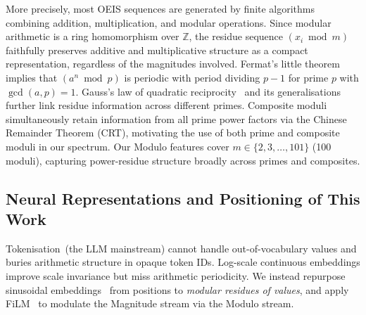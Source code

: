 More precisely, most OEIS sequences are generated by finite algorithms combining addition,
multiplication, and modular operations. Since modular arithmetic is a ring homomorphism over
$\mathbb{Z}$, the residue sequence $(x_i \bmod m)$ faithfully preserves additive and
multiplicative structure as a compact representation, regardless of the magnitudes involved.
Fermat's little theorem implies that $(a^n \bmod p)$ is periodic with period dividing $p-1$
for prime $p$ with $\gcd(a,p)=1$. Gauss's law of quadratic
reciprocity~\cite{gauss-reciprocity} and its generalisations further link residue information
across different primes.
Composite moduli simultaneously retain information from all prime power factors via the Chinese
Remainder Theorem (CRT), motivating the use of both prime and composite moduli in our spectrum.
Our Modulo features cover $m \in \{2, 3, \ldots, 101\}$ (100 moduli), capturing power-residue
structure broadly across primes and composites.

\subsection{Neural Representations and Positioning of This Work}
\label{sec:background:repr-position}

Tokenisation~(the LLM mainstream) cannot handle out-of-vocabulary values and buries
arithmetic structure in opaque token IDs. Log-scale continuous embeddings improve scale
invariance but miss arithmetic periodicity. We instead repurpose sinusoidal
embeddings~\cite{vaswani2017attention} from positions to \emph{modular residues of values},
and apply FiLM~\cite{perez2018film} to modulate the Magnitude stream via the Modulo stream.


